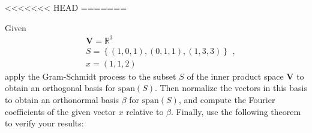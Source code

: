 \begin{homeworkProblem}
<<<<<<< HEAD
\solution
=======

Given \[
\begin{aligned}
    &\mathbf{V} = \mathbb{R}^3 \\
    &S = \left\{ (1,0,1), (0,1,1), (1,3,3)\right\} \\
    &x = (1,1,2)
\end{aligned},
\]apply the Gram-Schmidt process to the subset $S$ of the inner product space $\mathbf{V}$ to obtain an orthogonal basis for $\text{span}(S)$. Then normalize the vectors in this basis to obtain an orthonormal basis $\beta$ for $\text{span}(S)$, and compute the Fourier coefficients of the given vector $x$ relative to $\beta$. Finally, use the following theorem to verify your results:


\end{homeworkProblem}
